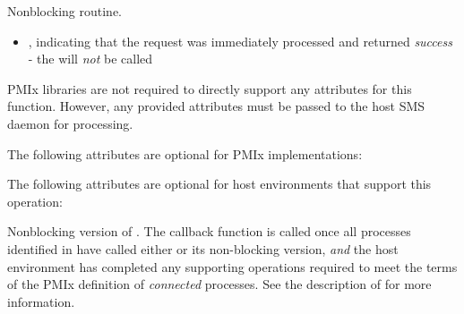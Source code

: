 \summary

Nonblocking  routine.

\format


\begin{arglist}
\end{arglist}

\returnsimplenb

\returnstart
\begin{itemize}
    \item {}, indicating that the request was immediately processed and returned \textit{success} - the  will \textit{not} be called
\end{itemize}
\returnend

\reqattrstart
\ac{PMIx} libraries are not required to directly support any attributes for this function. However, any provided attributes must be passed to the host \ac{SMS} daemon for processing.

\reqattrend

\optattrstart
The following attributes are optional for \ac{PMIx} implementations:



The following attributes are optional for host environments that support this operation:


\optattrend

\descr

Nonblocking version of . The callback function is called once all processes identified in  have called either  or its non-blocking version, \textit{and} the host environment has completed any supporting operations required to meet the terms of the \ac{PMIx} definition of \textit{connected} processes. See the description of  for more information.


